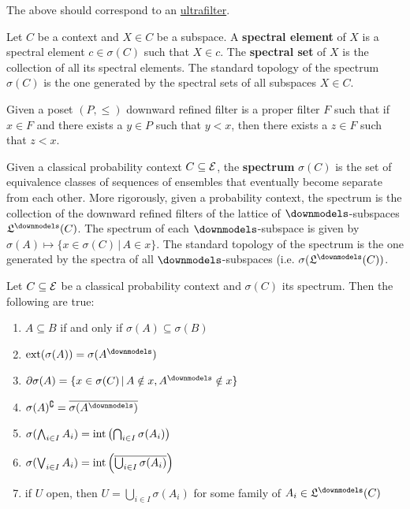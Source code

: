 \begin{remark}
	The above should correspond to an \href{https://en.wikipedia.org/wiki/Ultrafilter}{ultrafilter}.
\end{remark}

\begin{defn}
	Let $C$ be a context and $X \in C$ be a subspace. A \textbf{spectral element} of $X$ is a spectral element $c \in \sigma(C)$ such that $X \in c$. The \textbf{spectral set} of $X$ is the collection of all its spectral elements. The standard topology of the spectrum $\sigma(C)$ is the one generated by the spectral sets of all subspaces $X \in C$.
\end{defn}

	\begin{defn}
		Given a poset $(P, \leq)$ downward refined filter is a proper filter $F$ such that if $x \in F$ and there exists a $y \in P$ such that $y < x$, then there exists a $z \in F$ such that $z < x$.
	\end{defn}
	
	\begin{defn}
		Given a classical probability context $C \subseteq \mathcal{E}$, the \textbf{spectrum} $\sigma(C)$ is the set of equivalence classes of sequences of ensembles that eventually become separate from each other. More rigorously, given a probability context, the spectrum is the collection of the downward refined filters of the lattice of $\separate$-subspaces $\mathfrak{L}^\separate(C)$. The spectrum of each $\separate$-subspace is given by $\sigma(A) \mapsto \{ x \in \sigma(C) \, | \, A \in x \}$. The standard topology of the spectrum is the one generated by the spectra of all $\separate$-subspaces (i.e. $\sigma(\mathfrak{L}^\separate(C))$.
	\end{defn}
	
	\begin{prop}
		Let $C \subseteq \mathcal{E}$ be a classical probability context and $\sigma(C)$ its spectrum. Then the following are true:
		\begin{enumerate}
			\item $A \subseteq B$ if and only if $\sigma(A) \subseteq \sigma(B)$
			\item $\exterior(\sigma(A)) = \sigma(A^{\separate})$
			\item $\partial \sigma(A) = \{ x \in \sigma(C) \, | \, A \notin x, A^{\separate} \notin x \}$
			\item $\sigma(A)^{\complement} = \overline{\sigma(A^{\separate})}$
			\item $\sigma(\bigwedge_{i \in I} A_i) = \operatorname{int}\left(\bigcap_{i \in I} \sigma(A_i)\right)$
			\item $\sigma(\bigvee_{i \in I} A_i) = \operatorname{int}\left(\overline{\bigcup_{i \in I} \sigma(A_i)}\right)$
			\item if $U$ open, then $U = \bigcup_{i \in I} \sigma(A_i)$ for some family of $A_i \in \mathfrak{L}^\separate(C)$
		\end{enumerate}
	\end{prop}
	
